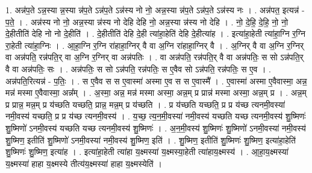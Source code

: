 \documentclass[17pt]{extarticle}
\begin{document}
1. अन्न॑प॒ते ऽन्न॒स्या न्न॒स्या न्न॑प॒ते ऽन्न॑प॒ते ऽन्न॑स्य नो नो॒ अन्न॒स्या न्न॑प॒ते ऽन्न॑प॒ते ऽन्न॑स्य नः । . अन्न॑पत॒ इत्यन्न॑ - प॒ते॒ । . अन्न॑स्य नो नो॒ अन्न॒स्या न्न॑स्य नो देहि देहि नो॒ अन्न॒स्या न्न॑स्य नो देहि । . नो॒ दे॒हि॒ दे॒हि॒ नो॒ नो॒ दे॒हीतीति॑ देहि नो नो दे॒हीति॑ । . दे॒हीतीति॑ देहि दे॒ही त्या॑हा॒हेति॑ देहि दे॒हीत्या॑ह । . इत्या॑हा॒हेती त्या॑हा॒ग्नि र॒ग्नि रा॒हेती त्या॑हा॒ग्निः । . आ॒हा॒ग्नि र॒ग्नि रा॑हाहा॒ग्निर् वै वा अ॒ग्नि रा॑हाहा॒ग्निर् वै । . अ॒ग्निर् वै वा अ॒ग्नि र॒ग्निर् वा अन्न॑पति॒ रन्न॑पति॒र् वा अ॒ग्नि र॒ग्निर् वा अन्न॑पतिः । . वा अन्न॑पति॒ रन्न॑पति॒र् वै वा अन्न॑पतिः॒ स सो ऽन्न॑पति॒र् वै वा अन्न॑पतिः॒ सः । . अन्न॑पतिः॒ स सो ऽन्न॑पति॒ रन्न॑पतिः॒ स ए॒वैव सो ऽन्न॑पति॒ रन्न॑पतिः॒ स ए॒व । . अन्न॑पति॒रित्यन्न॑ - प॒तिः॒ । . स ए॒वैव स स ए॒वास्मा॑ अस्मा ए॒व स स ए॒वास्मै᳚ । . ए॒वास्मा॑ अस्मा ए॒वैवास्मा॒ अन्न॒ मन्न॑ मस्मा ए॒वैवास्मा॒ अन्न᳚म् । . अ॒स्मा॒ अन्न॒ मन्न॑ मस्मा अस्मा॒ अन्न॒म् प्र प्रान्न॑ मस्मा अस्मा॒ अन्न॒म् प्र । . अन्न॒म् प्र प्रान्न॒ मन्न॒म् प्र य॑च्छति यच्छति॒ प्रान्न॒ मन्न॒म् प्र य॑च्छति । . प्र य॑च्छति यच्छति॒ प्र प्र य॑च्छ त्यनमी॒वस्या॑ नमी॒वस्य॑ यच्छति॒ प्र प्र य॑च्छ त्यनमी॒वस्य॑ । . य॒च्छ॒ त्य॒न॒मी॒वस्या॑ नमी॒वस्य॑ यच्छति यच्छ त्यनमी॒वस्य॑ शु॒ष्मिणः॑ शु॒ष्मिणो॑ ऽनमी॒वस्य॑ यच्छति यच्छ त्यनमी॒वस्य॑ शु॒ष्मिणः॑ । . अ॒न॒मी॒वस्य॑ शु॒ष्मिणः॑ शु॒ष्मिणो॑ ऽनमी॒वस्या॑ नमी॒वस्य॑ शु॒ष्मिण॒ इतीति॑ शु॒ष्मिणो॑ ऽनमी॒वस्या॑ नमी॒वस्य॑ शु॒ष्मिण॒ इति॑ । . शु॒ष्मिण॒ इतीति॑ शु॒ष्मिणः॑ शु॒ष्मिण॒ इत्या॑हा॒हेति॑ शु॒ष्मिणः॑ शु॒ष्मिण॒ इत्या॑ह । . इत्या॑हा॒हेती त्या॑हा य॒क्ष्मस्या॑ य॒क्ष्मस्या॒हेती त्या॑हाय॒क्ष्मस्य॑ । . आ॒हा॒य॒क्ष्मस्या॑ य॒क्ष्मस्या॑ हाहा य॒क्ष्मस्ये तीत्य॑य॒क्ष्मस्या॑ हाहा य॒क्ष्मस्येति॑ । \newline
\end{document}
